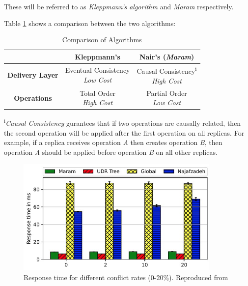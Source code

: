 \documentclass[12pt]{article}
\begin{document}
These will be referred to as \textit{Kleppmann's algorithm} and \textit{Maram}  respectively.

Table \ref{table:differences} shows a comparison between the two algorithms:

\begin{table}[ht]
    \def\arraystretch{2}
    \caption{Comparison of Algorithms} %
    \centering %
    \begin{tabular}{c c c} %
        \hline\hline %
                                & \textbf{Kleppmann's \cite{9563274}} & \textbf{Nair's (\textit{Maram}) \cite{https://doi.org/10.48550/arxiv.2103.04828}} \\ [0.5ex] %
        \hline %
        \textbf{Delivery Layer} & \makecell{Eventual Consistency                                                                                          \\ \textit{Low Cost}} & \makecell{Causal Consistency\textsuperscript{i}  \\ \textit{High Cost}}  \\ %
        \textbf{Operations}     & \makecell{Total Order                                                                                                   \\ \textit{High Cost}} & \makecell{Partial Order \\ \textit{Low Cost}}

        \\ [1ex] %
        \hline %
    \end{tabular}
    \label{table:differences} %
\end{table}

\textsuperscript{i}\textit{Causal Consistency} gurantees that if two operations are causally related, then the second operation will be applied after the first operation on all replicas. For example, if a replica receives operation \textit{A} then creates operation \textit{B}, then operation \textit{A} should be applied before operation \textit{B} on all other replicas. \par

\begin{figure}[H]
    \centering
    \includegraphics[width=10cm]{Response.jpg}
    \caption{Response time for different conflict rates (0-20\%). Reproduced from \cite{https://doi.org/10.48550/arxiv.2103.04828}}
    \label{fig:responsetime}
\end{figure}
\end{document}
